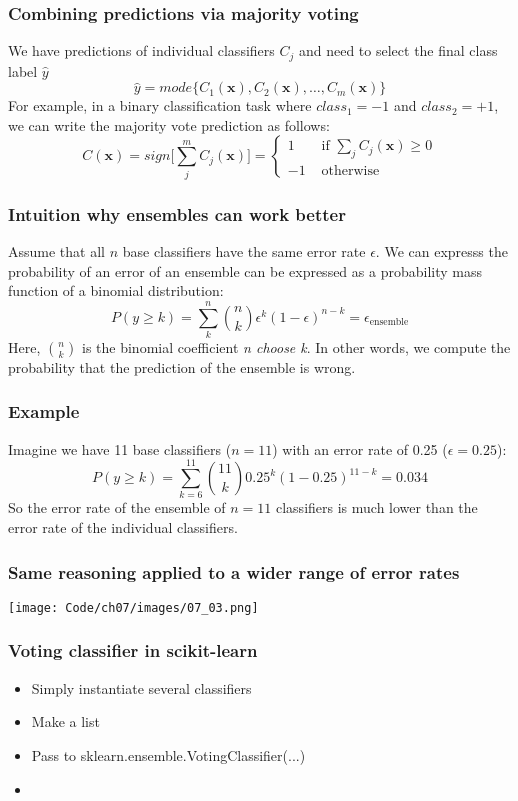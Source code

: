 \documentclass{beamer}
\begin{document}
\begin{frame}
  \frametitle{Combining predictions via majority voting}
  We have predictions of individual classifiers $C_j$ and need to select the final class label $\hat{y}$
  \[
  \hat{y} = mode \{ C_1 (\mathbf{x}), C_2 (\mathbf{x}), \dots, C_m (\mathbf{x}) \}
  \]
  For example, in a binary classification task where $class_1 = -1$ and $class_2 = +1$, we can write the majority vote prediction as follows:
  \[
  C(\mathbf{x}) = sign \Bigg[ \sum_{j}^{m} C_j (\mathbf{x}) \Bigg] = \begin{cases}
        1 & \text{ if } \sum_j C_j (\mathbf{x}) \ge 0 \\
        -1 & \text{ otherwise }
     \end{cases}
  \]
\end{frame}

\begin{frame}
  \frametitle{Intuition why ensembles can work better}
  Assume that all $n$ base classifiers have the same error rate $\epsilon$. We can expresss the probability of an error of an ensemble can be expressed as a probability mass function of a binomial distribution:
  \[
  P(y \ge k) = \sum_{k}^{n} \binom{n}{k} \epsilon^k (1 - \epsilon)^{n-k} = \epsilon_{\text{ensemble}}
  \]
  Here, $\binom{n}{k}$ is the binomial coefficient \textit{n choose k}. In other words, we compute the probability that the prediction of the ensemble is wrong.
\end{frame}

\begin{frame}
  \frametitle{Example}
  Imagine we have 11 base classifiers ($n=11$) with an error rate of 0.25 ($\epsilon = 0.25$):
  \[
  P(y \ge k) = \sum_{k=6}^{11} \binom{11}{k} 0.25^k (1 - 0.25)^{11-k} = 0.034
  \]
  So the error rate of the ensemble of $n=11$ classifiers is much lower than the error rate of the individual classifiers.
\end{frame}

\begin{frame}
  \frametitle{Same reasoning applied to a wider range of error rates}
  \center
  \texttt{[image: Code/ch07/images/07\_03.png]}
\end{frame}

\begin{frame}
  \frametitle{Voting classifier in scikit-learn}
  \begin{itemize}
  \item Simply instantiate several classifiers
  \item Make a list
  \item Pass to sklearn.ensemble.VotingClassifier(...)
  \item  \href{http://scikit-learn.org/stable/modules/generated/sklearn.ensemble.VotingClassifier.html}{}
  \end{itemize}
\end{frame}
\end{document}
